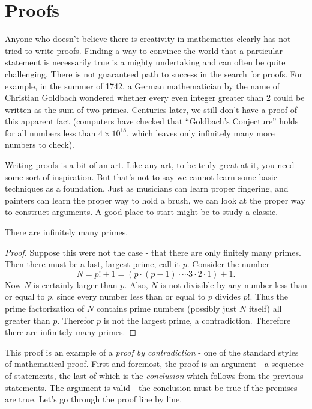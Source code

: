 \documentclass[12pt]{article}
\begin{document}
\section{Proofs}

Anyone who doesn't believe there is creativity in mathematics clearly has not tried to write proofs.  Finding a way to convince the world that a particular statement is necessarily true is a mighty undertaking and can often be quite challenging.  There is not guaranteed path to success in the search for proofs.  For example, in the summer of 1742, a German mathematician by the name of Christian Goldbach wondered whether every even integer greater than 2 could be written as the sum of two primes.  Centuries later, we still don't have a proof of this apparent fact (computers have checked that ``Goldbach's Conjecture'' holds for all numbers less than $4\times 10^{18}$, which leaves only infinitely many more numbers to check). 

Writing proofs is a bit of an art.  Like any art, to be truly great at it, you need some sort of inspiration.  But that's not to say we cannot learn some basic techniques as a foundation.  Just as musicians can learn proper fingering, and painters can learn the proper way to hold a brush, we can look at the proper way to construct arguments.  A good place to start might be to study a classic.


 \begin{theorem}
  There are infinitely many primes.
 \end{theorem}
 
 \begin{proof}
  Suppose this were not the case - that there are only finitely many primes.  Then there must be a last, largest prime, call it $p$. Consider the number 
  \[N = p! + 1 = (p \cdot (p-1) \cdot \cdots 3\cdot 2 \cdot 1) + 1.\]
  Now $N$ is certainly larger than $p$.  Also, $N$ is not divisible by any number less than or equal to $p$, since every number less than or equal to $p$ divides $p!$.  Thus the prime factorization of $N$ contains prime numbers (possibly just $N$ itself) all greater than $p$.  Therefor $p$ is not the largest prime, a contradiction.  Therefore there are infinitely many primes.
 \end{proof}
 
 This proof is an example of a {\em proof by contradiction} - one of the standard styles of mathematical proof.  First and foremost, the proof is an argument - a sequence of statements, the last of which is the {\em conclusion} which follows from the previous statements.  The argument is valid - the conclusion must be true if the premises are true.  Let's go through the proof line by line.
 
\end{document}
